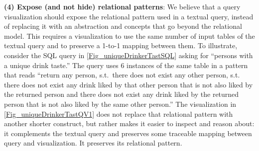 \documentclass[letterpaper,11pt]{article}
\begin{document}
\textbf{(4) Expose (and not hide) relational patterns}:
We believe that a query visualization should expose the relational pattern used in a textual query,
instead of replacing it with an abstraction and concepts that go beyond the relational model.
This requires a visualization to use the same number of input tables of the textual query 
and to preserve a 1-to-1 mapping between them.
To illustrate, consider the SQL query in
\autoref{Fig_uniqueDrinkerTastSQL} asking for ``persons with a unique drink taste.''
The query uses 6 instances of the same table in a pattern that reads
``return any person, s.t.\ there does not exist any other person, s.t. there does not exist any drink liked by that other person 
that is not also liked by the returned person and there does not exist any drink liked by the returned person that is not also liked by the same other person.''
The visualization in \autoref{Fig_uniqueDrinkerTastQV1}
does not replace that relational pattern with another shorter construct, but rather 
makes it easier to inspect and reason about:
it complements the textual query
and preserves some traceable mapping between query and visualization. It preserves its relational pattern.
\end{document}
